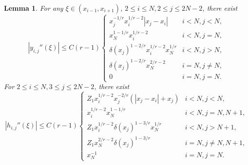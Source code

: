 \documentclass{amsart}
\newtheorem{lemma}[theorem]{Lemma}
\theoremstyle{definition}
\theoremstyle{remark}
\numberwithin{equation}{section}
\begin{document}
\begin{lemma} \label{lmm:esitmate-of-MTFs-2}
  For any \(\xi \in (x_{i-1}, x_{i+1})\), \(2\le i \le N, 2\le j \le 2N-2\), there exist
  \begin{equation*}
    |y_{i,j}''(\xi)| \le C(r-1)
    \begin{cases}
      x_j^{-1/r} x_i^{1/r-2} |x_j - x_i|  & i < N, j < N,  \\
      x_N^{1-1/r} x_i^{1/r-2}             & i < N, j = N , \\
      \delta(x_j)^{1-2/r} x_i^{1/r-2} x_N^{1/r}     & i < N, j > N , \\
      \delta(x_j)^{1-2/r} x_N^{2/r-2}             & i = N, j \neq N , \\
      0   & i = N, j = N.
    \end{cases}
  \end{equation*}
  For \(2\le i \le N, 3\le j \le 2N-2\),  there exist 
  \begin{equation*}
    |h_{i,j}''(\xi)| \le C (r-1)
    \begin{cases}
      Z_1 x_i^{1/r-2} x_j^{-2/r} (|x_j - x_i| + x_j)   & i < N, j < N , \\
      x_i^{1/r-2} x_N^{1-1/r}                        & i < N, j=N, N+1, \\
      Z_1 x_i^{1/r-2} \delta(x_j)^{1-3/r}  x_N^{1/r}    & i < N, j>N+1 ,\\
      Z_1 x_N^{2/r-2} \delta(x_j)^{1-3/r}               & i = N, j \neq N, N+1 , \\
      x_N^{-1}                                       & i = N, j = N.
    \end{cases}
  \end{equation*}
\end{lemma}
\end{document}
